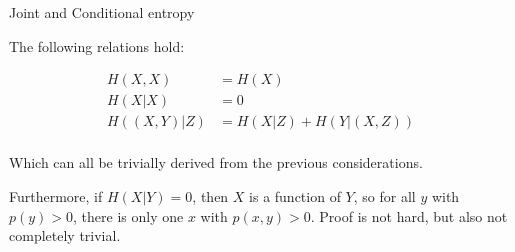 \documentclass[11pt,compress,t,notes=noshow, xcolor=table]{beamer}
\begin{document}

\begin{vbframe} {Joint and Conditional entropy}

The following relations hold:

\begin{equation*}
\begin{aligned}
H(X, X)       &= H(X)  \\
H(X | X)      &= 0  \\
H( (X, Y) | Z)   &=H(X | Z)+H(Y | (X, Z))\\
\end{aligned}
\end{equation*}

Which can all be trivially derived from the previous considerations.

\lz

Furthermore, if $H(X|Y) = 0$, then $X$ is a function of $Y$, so for all $y$ with $p(y)>0$, there is only one $x$ with $p(x,y)>0$. 
Proof is not hard, but also not completely trivial.
\end{vbframe}
\end{document}
